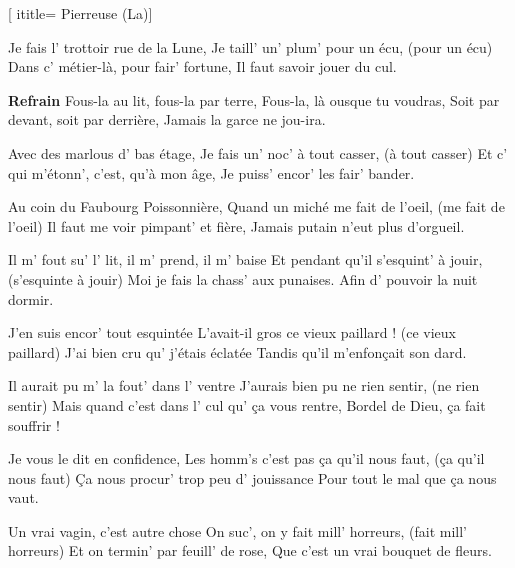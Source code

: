  [
ititle= {Pierreuse (La)}]

\beginverse
Je fais l' trottoir rue de la Lune,
Je taill' un' plum' pour un écu, (pour un écu)
Dans c' métier-là, pour fair' fortune,
Il faut savoir jouer du cul.
\endverse

\beginchorus
\textbf {Refrain}
Fous-la au lit, fous-la par terre,
Fous-la, là ousque tu voudras,
Soit par devant, soit par derrière,
Jamais la garce ne jou-ira.
\endchorus

\beginverse
Avec des marlous d' bas étage,
Je fais un' noc' à tout casser, (à tout casser)
Et c' qui m'étonn', c'est, qu'à mon âge,
Je puiss' encor' les fair' bander.
\endverse

\beginverse
Au coin du Faubourg Poissonnière,
Quand un miché me fait de l'oeil, (me fait de l'oeil)
Il faut me voir pimpant' et fière,
Jamais putain n'eut plus d'orgueil.
\endverse

\beginverse
Il m' fout su' l' lit, il m' prend, il m' baise
Et pendant qu'il s'esquint' à jouir, (s'esquinte à jouir)
Moi je fais la chass' aux punaises.
Afin d' pouvoir la nuit dormir.
\endverse

\beginverse
J'en suis encor' tout esquintée
L'avait-il gros ce vieux paillard ! (ce vieux paillard)
J'ai bien cru qu' j'étais éclatée
Tandis qu'il m'enfonçait son dard.
\endverse

\beginverse
Il aurait pu m' la fout' dans l' ventre
J'aurais bien pu ne rien sentir, (ne rien sentir)
Mais quand c'est dans l' cul qu' ça vous rentre,
Bordel de Dieu, ça fait souffrir !
\endverse

\beginverse
Je vous le dit en confidence,
Les homm's c'est pas ça qu'il nous faut, (ça qu'il nous faut)
Ça nous procur' trop peu d' jouissance
Pour tout le mal que ça nous vaut.
\endverse

\beginverse
Un vrai vagin, c'est autre chose
On suc', on y fait mill' horreurs, (fait mill' horreurs)
Et on termin' par feuill' de rose,
Que c'est un vrai bouquet de fleurs.
\endverse

\endsong